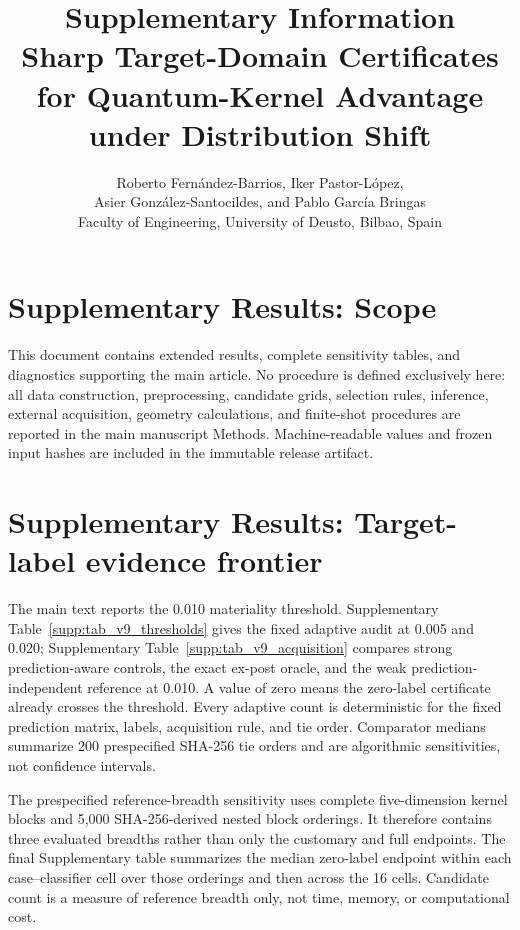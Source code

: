 \documentclass[11pt]{article}
\title{\textbf{Supplementary Information}\\[0.5em]
Sharp Target-Domain Certificates for Quantum-Kernel Advantage under Distribution Shift}
\author{Roberto Fern\'andez-Barrios, Iker Pastor-L\'opez,\\
Asier Gonz\'alez-Santocildes, and Pablo Garc\'ia Bringas\\[0.4em]
\small Faculty of Engineering, University of Deusto, Bilbao, Spain}
\date{}
\begin{document}
\maketitle

\section*{Supplementary Results: Scope}

This document contains extended results, complete sensitivity tables, and
diagnostics supporting the main article. No procedure is defined exclusively
here: all data construction, preprocessing, candidate grids, selection rules,
inference, external acquisition, geometry calculations, and finite-shot
procedures are reported in the main manuscript Methods. Machine-readable
values and frozen input hashes are included in the immutable release artifact.

\section*{Supplementary Results: Target-label evidence frontier}
\label{supp:v9_frontier}

The main text reports the 0.010 materiality threshold. Supplementary
Table~\ref{supp:tab_v9_thresholds} gives the fixed adaptive audit at 0.005 and
0.020; Supplementary Table~\ref{supp:tab_v9_acquisition} compares strong
prediction-aware controls, the exact ex-post oracle, and the weak
prediction-independent reference at 0.010. A value of zero means the
zero-label certificate already crosses the threshold. Every adaptive count is
deterministic for the fixed prediction matrix, labels, acquisition rule, and
tie order. Comparator medians summarize 200 prespecified SHA-256 tie orders
and are algorithmic sensitivities, not confidence intervals.

The prespecified reference-breadth sensitivity uses complete five-dimension
kernel blocks and 5,000 SHA-256-derived nested block orderings. It therefore
contains three evaluated breadths rather than only the customary and full
endpoints. The final Supplementary table summarizes the median zero-label
endpoint within each case--classifier cell over those orderings and then
across the 16 cells. Candidate count is a measure of reference breadth only,
not time, memory, or computational cost.
\end{document}
